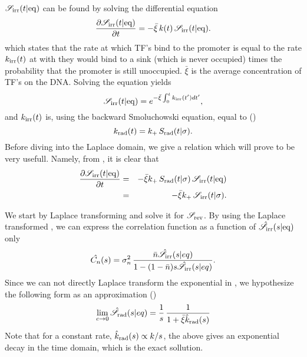 $\mathscr{S}_{\rm irr}(t|{\rm eq})$ can be found by solving the differential equation
\begin{equation}
 \pdiff{\mathscr{S}_{\rm irr}(t|{\rm eq})}{t} = - \bar{\xi} \, k(t) \, \mathscr{S}_{\rm irr}(t|{\rm eq}).
 \elabel{DE_Seq}
\end{equation}
which states that the rate at which TF's bind to the promoter is equal to the rate $k_{{\rm irr}}(t)$ at with they would bind to a sink (which is never occupied) times the probability that the promoter is still unoccupied. $\bar{\xi}$ is the average concentration of TF's on the DNA. Solving the equation yields
\begin{equation}
 \mathscr{S}_{\rm irr}(t|{\rm eq}) = e^{-\bar{\xi}\int_0^t k_{{\rm irr}}(t') dt'},
 \elabel{Seq}
\end{equation}
and $k_{{\rm irr}}(t)$ is, using the backward Smoluchowski equation, equal to ()
\begin{equation}
 k_{\rm rad}(t) = k_+ \, S_{\rm rad}(t|\sigma).
 \elabel{krad}
\end{equation}
Before diving into the Laplace domain, we give a relation which will prove to be very usefull. Namely, from , it is clear that
\begin{eqnarray}
 \pdiff{\mathscr{S}_{\rm irr}(t|{\rm eq})}{t} & = & -\bar{\xi} k_+ \, S_{\rm rad}(t|\sigma) \, \mathscr{S}_{\rm irr}(t|{\rm eq}) \\
 & = & -\bar{\xi} k_+ \, \mathscr{S}_{\rm irr}(t|\sigma).
 \elabel{SeqSsi}
\end{eqnarray}

We start by Laplace transforming  and solve it for $\mathscr{S}_{\rm rev}$. By using the Laplace transformed , we can express the correlation function as a function of $\hat{\mathscr{S}}_{\rm irr}(s|{\rm eq})$ only
\begin{equation}
 \hat{C_n}(s) = \sigma_n^2 \, \frac{\bar{n} \hat{\mathscr{S}}_{\rm irr}(s|eq)}{1-(1-\bar{n})s\hat{\mathscr{S}}_{\rm irr}(s|eq)}.
 \elabel{LapCorr}
\end{equation}
Since we can not directly Laplace transform the exponential in , we hypothesize the following form as an approximation ()
\begin{equation}
 \lim_{c\to0} \hat{\mathscr{S}}_{\rm rad}(s|eq) = \frac{1}{s}  \, \frac{1}{ 1 + \bar{\xi} \hat{k}_{\rm rad}(s)}
 \elabel{Seq_approx}
\end{equation}
Note that for a constant rate, $\hat{k}_{\rm rad}(s) \propto k/s$, the above gives an exponential decay in the time domain, which is the exact sollution. 

